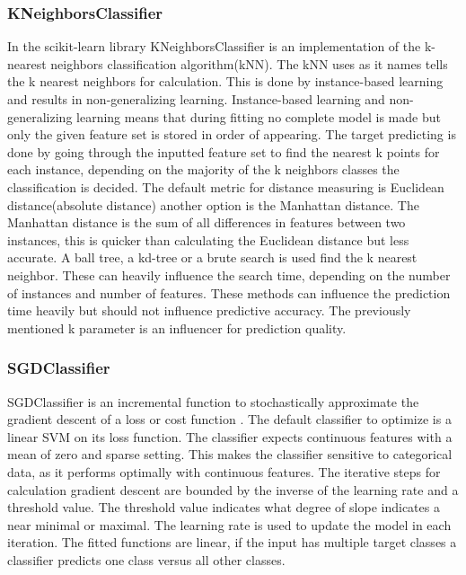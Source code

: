 \documentclass[a4paper,10pt]{article}
\begin{document}
\subsubsection{KNeighborsClassifier}
In the scikit-learn library KNeighborsClassifier is an implementation of the k-nearest neighbors classification algorithm(kNN)\cite{KNN}. The kNN uses as it names tells the k nearest neighbors for calculation. This is done by instance-based learning and results in non-generalizing learning. Instance-based learning and non-generalizing learning means that during fitting no complete model is made but only the given feature set is stored in order of appearing. The target predicting is done by going through the inputted feature set to find the nearest k points for each instance, depending on the majority of the k neighbors classes the classification is decided. The default metric for distance measuring is Euclidean distance(absolute distance) another option is the Manhattan distance. The Manhattan distance is the sum of all differences in features between two instances, this is quicker than calculating the Euclidean distance but less accurate. A ball tree, a kd-tree or a brute search is used find the k nearest neighbor. These can heavily influence the search time, depending on the number of instances and number of features. These methods can influence the prediction time heavily but should not influence predictive accuracy. The previously mentioned k parameter is an influencer for prediction quality.\cite{KNN-k}

\subsubsection{SGDClassifier}
SGDClassifier is an incremental function to stochastically approximate the gradient descent of a loss or cost function \cite{SGDClass}. The default classifier to optimize is a linear SVM on its loss function. The classifier expects continuous features with a mean of zero and sparse setting. This makes the classifier sensitive to categorical data, as it performs optimally with continuous features. The iterative steps for calculation gradient descent are bounded by the inverse of the learning rate and a threshold value. The threshold value indicates what degree of slope indicates a near minimal or maximal. The learning rate is used to update the model in each iteration. The fitted functions are linear, if the input has multiple target classes a classifier predicts one class versus all other classes. 
\end{document}
